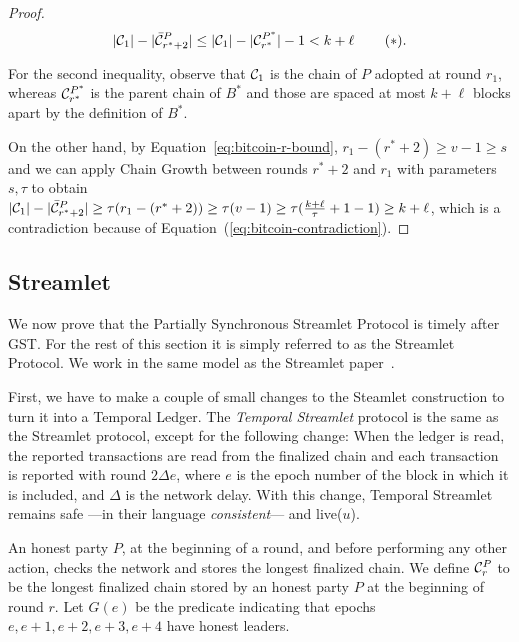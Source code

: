 \begin{proof}

  \[
     |\mathcal{C}_1| - |\bar {\mathcal{C}}^P_{r^* + 2}| \leq
     |\mathcal{C}_1| - |\mathcal{C}^{P^*}_{r^*}| - 1 <
     k + \ell\, \label{eq:bitcoin-contradiction}\tag{$\ast$}.
  \]

  For the second inequality, observe that
  $\mathcal{C}_1$ is the chain of $P$ adopted at round $r_1$,
  whereas $\mathcal{C}^{P^*}_{r^*}$ is
  the parent chain of $B^*$ and those are spaced at most $k + \ell$ blocks
  apart by the definition of $B^*$.

  On the other hand, by Equation~\ref{eq:bitcoin-r-bound}, $r_1 - (r^* + 2) \geq v - 1 \geq s$ and
  we can apply Chain Growth between rounds $r^* + 2$ and $r_1$
  with parameters $s, \tau$ to obtain
  $|\mathcal{C}_1| - |\bar {\mathcal{C}}^P_{r^* + 2}| \geq \tau(r_1 - (r^* + 2)) \geq \tau (v - 1) \geq
  \tau (\frac{k + \ell}{\tau} + 1 - 1) \geq k + \ell$,
  which is a contradiction because of Equation~(\ref{eq:bitcoin-contradiction}).

  \Qed
\end{proof}

\subsection{Streamlet}

We now prove that the Partially Synchronous Streamlet Protocol is timely
after GST. For the rest of this section it is simply referred to as the Streamlet Protocol.
We work in the same model as the Streamlet paper~\cite{streamlet}.

First, we have to make a couple of small changes to the Steamlet construction to turn it
into a Temporal Ledger.
The \emph{Temporal Streamlet} protocol is the same as the Streamlet protocol, except
for the following change: When the ledger is \textsf{read}, the reported transactions are
read from the finalized chain and each transaction is reported with round $2\Delta e$,
where $e$ is the epoch number of the block in which it is included, and $\Delta$ is the
network delay.
With this change, Temporal Streamlet remains safe ---in their language \emph{consistent}--- and live($u$).

An honest party $P$, at the beginning of a round, and
before performing any other action, checks the network and
stores the longest finalized chain.
We define $\mathcal{C}^P_r$ to be the longest finalized chain stored by an honest
party $P$ at the beginning of round $r$.
Let $G(e)$ be the predicate indicating that epochs $e,e+1,e+2,e+3,e+4$ have honest leaders.

